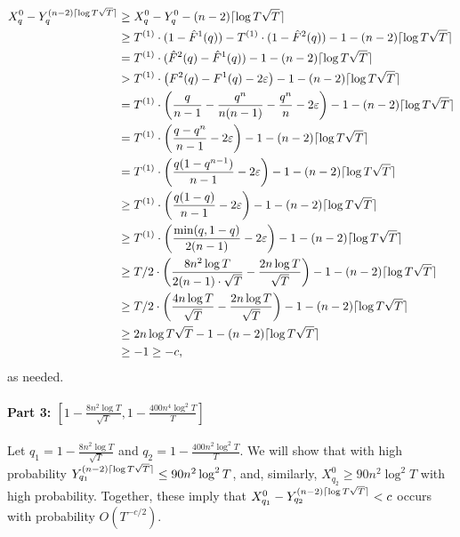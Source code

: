         \begin{align*}
            X^0_q - Y^{(n - 2) \lceil\log T \sqrt{T}\rceil}_q
            &\ge X^0_q - Y^0_q - (n - 2) \lceil\log T \sqrt{T}\rceil\\
            &\ge  T^{(1)} \cdot (1 - \hat{F}^1(q)) - T^{(1)} \cdot ( 1 - \hat{F}^2(q)) -1  - (n - 2) \lceil\log T \sqrt{T}\rceil\\
            &= T^{(1)} \cdot (\hat{F}^2(q) - \hat{F}^1(q)) - 1 - (n - 2) \lceil\log T \sqrt{T}\rceil\\
            &> T^{(1)} \cdot \left(F^2(q) - F^1(q) - 2 \varepsilon\right) - 1 - (n - 2) \lceil\log T \sqrt{T}\rceil\\
            &= T^{(1)} \cdot \left(\frac{q}{n - 1} - \frac{q^n}{n(n - 1)} - \frac{q^n}{n} - 2 \varepsilon\right) - 1 - (n - 2) \lceil\log T \sqrt{T}\rceil\\
            &= T^{(1)} \cdot \left(\frac{q - q^n}{n - 1} - 2 \varepsilon\right) - 1 - (n - 2) \lceil\log T \sqrt{T}\rceil\\
            &=  T^{(1)} \cdot \left(\frac{q(1 - q^{n-1})}{n - 1} - 2 \varepsilon\right) - 1 - (n - 2) \lceil\log T \sqrt{T}\rceil\\
            &\ge  T^{(1)} \cdot \left(\frac{q(1 - q)}{n - 1} - 2 \varepsilon\right) - 1 - (n - 2) \lceil\log T \sqrt{T}\rceil\\
            &\ge  T^{(1)} \cdot \left(\frac{\min(q, 1 - q)}{2(n - 1)} - 2 \varepsilon\right) - 1 - (n - 2) \lceil\log T \sqrt{T}\rceil\\
            &\ge  T / 2 \cdot \left(\frac{8n^2 \log T}{2(n - 1) \cdot \sqrt{T}} - \frac{2n \log T}{\sqrt{T}} \right) - 1 - (n - 2)\lceil\log T \sqrt{T}\rceil\\
            &\ge  T / 2 \cdot \left(\frac{4n \log T}{\sqrt{T}} - \frac{2n \log T}{\sqrt{T}} \right) - 1 - (n - 2)\lceil\log T \sqrt{T}\rceil\\
            &\ge  2n \log T \sqrt{T} - 1 - (n - 2)\lceil\log T \sqrt{T}\rceil\\
            &\ge -1 \ge -c,
        \end{align*}
        as needed.

    \paragraph{Part 3: $\left[1 - \frac{ 8n^2 \log T}{\sqrt{T}}, 1 - \frac{400n^4 \log^2T}{T} \right]$} Let $q_1 = 1 - \frac{ 8n^2 \log T}{\sqrt{T}}$ and $q_2 =  1 - \frac{400n^2 \log^2T}{T}$. We will show that with high probability $Y^{(n - 2) \lceil\log T \sqrt{T}\rceil}_{q_1} \le 90n^2\log^2 T$, and, similarly, $X^0_{q_2} \ge 90n^2\log^2 T$ with high probability. Together, these imply that $X^0_{q_1} - Y^{(n - 2) \lceil\log T \sqrt{T}\rceil}_{q_2} < c$ occurs with probability $O(T^{-c/2})$.

